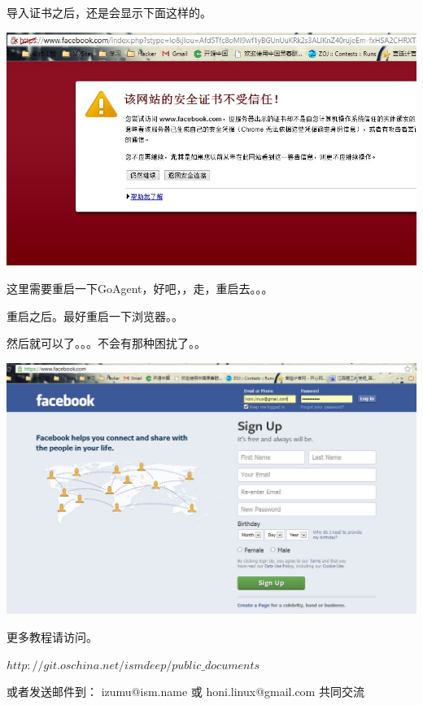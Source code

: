 \documentclass[12pt,a4paper,landscape]{article}
\begin{document}
\begin{CJK}{UTF8}{gbsn}
导入证书之后，还是会显示下面这样的。

\includegraphics[scale=1]{pic/007.jpg}

\newpage

这里需要重启一下GoAgent，好吧，，走，重启去。。。

重启之后。最好重启一下浏览器。。

然后就可以了。。。不会有那种困扰了。。

\includegraphics[scale=0.75]{pic/008.jpg}


\newpage
\Large{更多教程请访问。

$http://git.oschina.net/ismdeep/public\_documents$

或者发送邮件到： izumu@ism.name 或 honi.linux@gmail.com 共同交流

}

\end{CJK}
\end{document}
